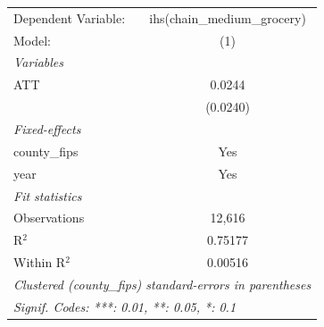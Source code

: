 
\begingroup
\centering
\begin{tabular}{lc}
   \tabularnewline \midrule \midrule
   Dependent Variable: & ihs(chain\_medium\_grocery)\\    
   Model:              & (1)\\  
   \midrule
   \emph{Variables}\\
   ATT                 & 0.0244\\   
                       & (0.0240)\\   
   \midrule
   \emph{Fixed-effects}\\
   county\_fips        & Yes\\  
   year                & Yes\\  
   \midrule
   \emph{Fit statistics}\\
   Observations        & 12,616\\  
   R$^2$               & 0.75177\\  
   Within R$^2$        & 0.00516\\  
   \midrule \midrule
   \multicolumn{2}{l}{\emph{Clustered (county\_fips) standard-errors in parentheses}}\\
   \multicolumn{2}{l}{\emph{Signif. Codes: ***: 0.01, **: 0.05, *: 0.1}}\\
\end{tabular}
\par\endgroup


